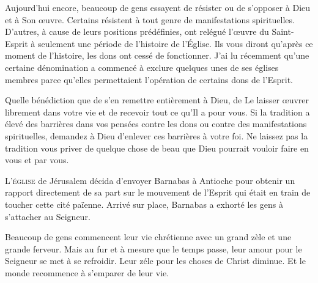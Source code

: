 
Aujourd'hui encore, beaucoup de gens essayent de résister ou de s'opposer
 à Dieu et à Son \oe{}uvre. Certains résistent à tout genre de manifestations
 spirituelles. D'autres, à cause de leurs positions prédéfinies,
 ont relégué l'\oe{}uvre du Saint-Esprit à seulement une période
 de l'histoire de l'Église. 
 Ils vous diront qu'après ce moment de l'histoire,
 les dons ont cessé de fonctionner. J'ai lu récemment qu'une certaine
 dénomination a commencé à exclure quelques unes de ses églises membres
 parce qu'elles permettaient l'opération de certains dons de l'Esprit.

Quelle bénédiction que de s'en remettre entièrement à Dieu,
 de Le laisser \oe{}uvrer librement dans votre vie et de recevoir
 tout ce qu'Il a pour vous. Si la tradition a élevé des barrières
 dans vos pensées contre les dons ou contre des manifestations spirituelles,
 demandez à Dieu d'enlever ces barrières à votre foi.
 Ne laissez pas la tradition vous priver de quelque chose de beau
 que Dieu pourrait vouloir faire en vous et par vous.

\dvrule






\lettrine{L}{'église} de Jérusalem décida d'envoyer Barnabas
 à Antioche pour obtenir un rapport directement de sa part sur le mouvement
 de l'Esprit qui était en train de toucher cette cité païenne.
 Arrivé sur place, Barnabas a exhorté les gens à s'attacher au Seigneur.

Beaucoup de gens commencent leur vie chrétienne avec un grand zèle
 et une grande ferveur. Mais au fur et à mesure que le temps passe,
 leur amour pour le Seigneur se met à se refroidir.
 Leur zéle pour les choses de Christ diminue.
 Et le monde recommence à s'emparer de leur vie.


